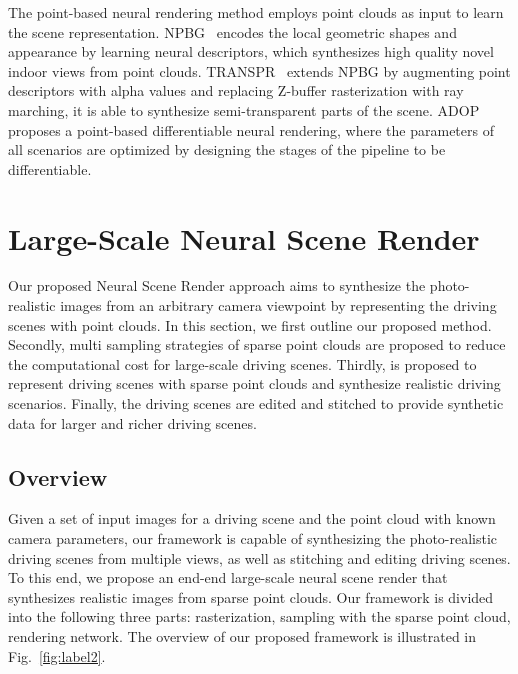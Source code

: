 \documentclass[sigconf]{acmart}
\begin{document}
The point-based neural rendering method employs point clouds as input to learn the scene representation. NPBG~\cite{aliev2020neural} encodes the local geometric shapes and appearance by learning neural descriptors, which synthesizes high quality novel indoor views from point clouds. TRANSPR~\cite{kolos2020transpr} extends NPBG by augmenting point descriptors with alpha values and replacing Z-buffer rasterization with ray marching, it is able to synthesize semi-transparent parts of the scene. ADOP~\cite{ruckert2021adop} proposes a point-based differentiable neural rendering, where the parameters of all scenarios are optimized by designing the stages of the pipeline to be differentiable.  



\section{Large-Scale Neural Scene Render}\label{sec:LNSR}
Our proposed Neural Scene Render approach aims to synthesize the photo-realistic images from an arbitrary camera viewpoint by representing the driving scenes with point clouds. In this section, we first outline our proposed method. Secondly, multi sampling strategies of sparse point clouds are proposed to reduce the computational cost for large-scale driving scenes. Thirdly,  is proposed to represent driving scenes with sparse point clouds and synthesize realistic driving scenarios. Finally, the driving scenes are edited and stitched to provide synthetic data for larger and richer driving scenes.




\subsection{Overview}
Given a set of input images for a driving scene and the point cloud  with known camera parameters, our framework is capable of synthesizing the photo-realistic driving scenes from multiple views, as well as stitching and editing driving scenes. To this end, we propose an end-end large-scale neural scene render that synthesizes realistic images from sparse point clouds. Our framework is divided into the following three parts: rasterization, sampling with the sparse point cloud,  rendering network. The overview of our proposed framework is illustrated in Fig.~\ref{fig:label2}.
\end{document}
